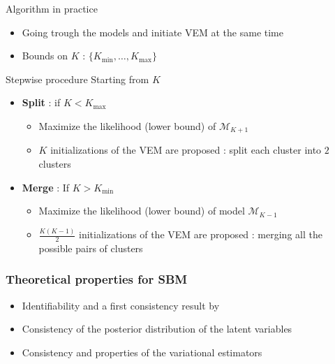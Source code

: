 \documentclass[compress,10pt]{beamer}
\begin{document}
\begin{frame}{Algorithm in practice}  
\begin{itemize}
\item Going trough the models and initiate VEM at the same time
\item Bounds on $K$ :  $\{K_{ \min},\dots, K_{\max}\}$
\end{itemize}

\begin{block}{Stepwise procedure}
Starting from  $K$

\begin{itemize}
\item \textbf{Split} : if $K<K_{\max}$
\begin{itemize}
\item Maximize the likelihood (lower bound) of  $\mathcal{M}_{K+1}$
\item  $K$ initializations of the VEM are proposed :  split each cluster into $2$ clusters  
\end{itemize}
\item \textbf{Merge} :  If $K>K_{\min}$
\begin{itemize}
\item Maximize the likelihood (lower bound) of   model  $\mathcal{M}_{K-1}$
\item  $\frac{K(K-1)}{2}$ initializations of the VEM are proposed :   merging all the possible pairs of  clusters 
 \end{itemize}
\end{itemize}

\end{block}
 \end{frame}


\begin{frame}\frametitle{Theoretical properties for SBM}
\begin{itemize}
\item Identifiability and a first consistency result by \textcolor{mygreen}{\cite{celisse2012consistency} }
\item Consistency of the posterior distribution of the latent variables \textcolor{mygreen}{\cite{mariadassou2015convergence}}
\item Consistency and properties of the variational estimators \textcolor{mygreen}{\cite{bickel2013asymptotic} \color{black}}
\end{itemize}
\end{frame}
\end{document}
